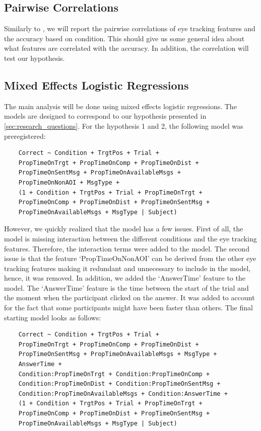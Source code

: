 \subsection{Pairwise Correlations}
\label{sec:analysis:corr}
Similarly to \cite{Vigneau_2006}, we will report the pairwise correlations of eye tracking features and the accuracy based on condition. This should give us some general idea about what features are correlated with the accuracy. In addition, the correlation will test our hypothesis.

\subsection{Mixed Effects Logistic Regressions}
\label{sec:analysis:mixed_effects}

The main analysis will be done using mixed effects logistic regressions. The models are designed to correspond to our hypothesis presented in \autoref{sec:research_questions}. For the hypothesis 1 and 2, the following model was preregistered:
\begin{verbatim}
    Correct ~ Condition + TrgtPos + Trial + 
    PropTimeOnTrgt + PropTimeOnComp + PropTimeOnDist + 
    PropTimeOnSentMsg + PropTimeOnAvailableMsgs + 
    PropTimeOnNonAOI + MsgType +
    (1 + Condition + TrgtPos + Trial + PropTimeOnTrgt + 
    PropTimeOnComp + PropTimeOnDist + PropTimeOnSentMsg + 
    PropTimeOnAvailableMsgs + MsgType | Subject)
\end{verbatim}

However, we quickly realized that the model has a few issues. First of all, the model is missing interaction between the different conditions and the eye tracking features. Therefore, the interaction terms were added to the model. The second issue is that the feature `PropTimeOnNonAOI' can be derived from the other eye tracking features making it redundant and unnecessary to include in the model, hence, it was removed. In addition, we added the `AnswerTime' feature to the model. The `AnswerTime' feature is the time between the start of the trial and the moment when the participant clicked on the answer. It was added to account for the fact that some participants might have been faster than others. The final starting model looks as follows:

\begin{verbatim}
    Correct ~ Condition + TrgtPos + Trial + 
    PropTimeOnTrgt + PropTimeOnComp + PropTimeOnDist + 
    PropTimeOnSentMsg + PropTimeOnAvailableMsgs + MsgType +
    AnswerTime +
    Condition:PropTimeOnTrgt + Condition:PropTimeOnComp +
    Condition:PropTimeOnDist + Condition:PropTimeOnSentMsg +
    Condition:PropTimeOnAvailableMsgs + Condition:AnswerTime +
    (1 + Condition + TrgtPos + Trial + PropTimeOnTrgt + 
    PropTimeOnComp + PropTimeOnDist + PropTimeOnSentMsg + 
    PropTimeOnAvailableMsgs + MsgType | Subject)
\end{verbatim}

